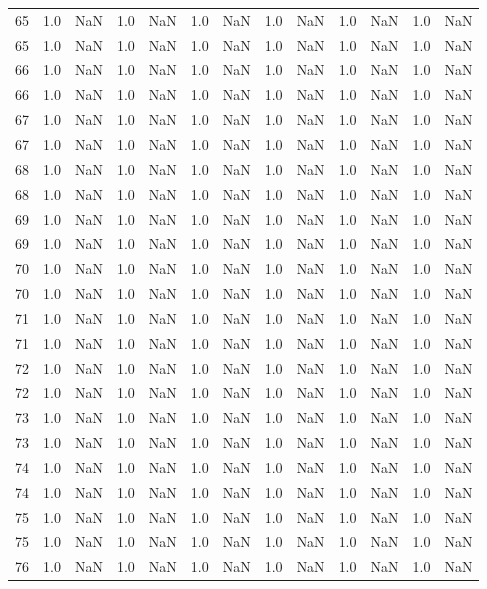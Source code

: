 \begin{tabular}{lrrrrrrrrrrrr}
65 & 1.0 & NaN & 1.0 & NaN & 1.0 & NaN & 1.0 & NaN & 1.0 & NaN & 1.0 & NaN \\
65 & 1.0 & NaN & 1.0 & NaN & 1.0 & NaN & 1.0 & NaN & 1.0 & NaN & 1.0 & NaN \\
66 & 1.0 & NaN & 1.0 & NaN & 1.0 & NaN & 1.0 & NaN & 1.0 & NaN & 1.0 & NaN \\
66 & 1.0 & NaN & 1.0 & NaN & 1.0 & NaN & 1.0 & NaN & 1.0 & NaN & 1.0 & NaN \\
67 & 1.0 & NaN & 1.0 & NaN & 1.0 & NaN & 1.0 & NaN & 1.0 & NaN & 1.0 & NaN \\
67 & 1.0 & NaN & 1.0 & NaN & 1.0 & NaN & 1.0 & NaN & 1.0 & NaN & 1.0 & NaN \\
68 & 1.0 & NaN & 1.0 & NaN & 1.0 & NaN & 1.0 & NaN & 1.0 & NaN & 1.0 & NaN \\
68 & 1.0 & NaN & 1.0 & NaN & 1.0 & NaN & 1.0 & NaN & 1.0 & NaN & 1.0 & NaN \\
69 & 1.0 & NaN & 1.0 & NaN & 1.0 & NaN & 1.0 & NaN & 1.0 & NaN & 1.0 & NaN \\
69 & 1.0 & NaN & 1.0 & NaN & 1.0 & NaN & 1.0 & NaN & 1.0 & NaN & 1.0 & NaN \\
70 & 1.0 & NaN & 1.0 & NaN & 1.0 & NaN & 1.0 & NaN & 1.0 & NaN & 1.0 & NaN \\
70 & 1.0 & NaN & 1.0 & NaN & 1.0 & NaN & 1.0 & NaN & 1.0 & NaN & 1.0 & NaN \\
71 & 1.0 & NaN & 1.0 & NaN & 1.0 & NaN & 1.0 & NaN & 1.0 & NaN & 1.0 & NaN \\
71 & 1.0 & NaN & 1.0 & NaN & 1.0 & NaN & 1.0 & NaN & 1.0 & NaN & 1.0 & NaN \\
72 & 1.0 & NaN & 1.0 & NaN & 1.0 & NaN & 1.0 & NaN & 1.0 & NaN & 1.0 & NaN \\
72 & 1.0 & NaN & 1.0 & NaN & 1.0 & NaN & 1.0 & NaN & 1.0 & NaN & 1.0 & NaN \\
73 & 1.0 & NaN & 1.0 & NaN & 1.0 & NaN & 1.0 & NaN & 1.0 & NaN & 1.0 & NaN \\
73 & 1.0 & NaN & 1.0 & NaN & 1.0 & NaN & 1.0 & NaN & 1.0 & NaN & 1.0 & NaN \\
74 & 1.0 & NaN & 1.0 & NaN & 1.0 & NaN & 1.0 & NaN & 1.0 & NaN & 1.0 & NaN \\
74 & 1.0 & NaN & 1.0 & NaN & 1.0 & NaN & 1.0 & NaN & 1.0 & NaN & 1.0 & NaN \\
75 & 1.0 & NaN & 1.0 & NaN & 1.0 & NaN & 1.0 & NaN & 1.0 & NaN & 1.0 & NaN \\
75 & 1.0 & NaN & 1.0 & NaN & 1.0 & NaN & 1.0 & NaN & 1.0 & NaN & 1.0 & NaN \\
76 & 1.0 & NaN & 1.0 & NaN & 1.0 & NaN & 1.0 & NaN & 1.0 & NaN & 1.0 & NaN \\

\end{tabular}
